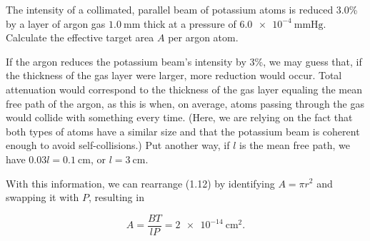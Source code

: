 \documentclass[../feynman-lectures-on-physics.tex]{subfiles}
\begin{document}
\begin{questions}
\begin{solution}
\end{solution}

\question The intensity of a collimated, parallel beam of potassium atoms is reduced $3.0$\% by a layer of argon gas $\SI{1.0}{\milli\meter}$ thick at a pressure of $\SI{6.0e-4}{\mmHg}$. Calculate the effective target area $A$ per argon atom.

\begin{solution}
	If the argon reduces the potassium beam's intensity by $3$\%, we may guess that, if the thickness of the gas layer were larger, more reduction would occur. Total attenuation would correspond to the thickness of the gas layer equaling the mean free path of the argon, as this is when, on average, atoms passing through the gas would collide with something every time. (Here, we are relying on the fact that both types of atoms have a similar size and that the potassium beam is coherent enough to avoid self-collisions.) Put another way, if $l$ is the mean free path, we have $0.03l = \SI{0.1}{\centi\meter}$, or $l = \SI{3}{\centi\meter}$.

	With this information, we can rearrange (1.12) by identifying $A = \pi{r}^2$ and swapping it with $P$, resulting in

	\[
	A = \frac{BT}{lP} = \SI{2e-14}{\centi\meter\squared}
	.\] 


\end{solution}
\end{questions}
\end{document}
